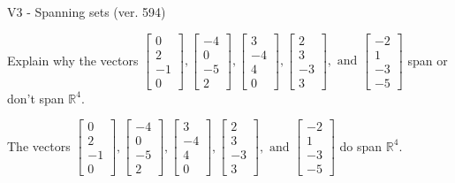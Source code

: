 \begin{exercise}
  \begin{exerciseTitle}V3 - Spanning sets (ver. 594)\end{exerciseTitle}
  \begin{exerciseStatement}
    Explain why the vectors \(\left[\begin{array}{r}
0 \\
2 \\
-1 \\
0
\end{array}\right] , \left[\begin{array}{r}
-4 \\
0 \\
-5 \\
2
\end{array}\right] , \left[\begin{array}{r}
3 \\
-4 \\
4 \\
0
\end{array}\right] , \left[\begin{array}{r}
2 \\
3 \\
-3 \\
3
\end{array}\right] , \text{ and } \left[\begin{array}{r}
-2 \\
1 \\
-3 \\
-5
\end{array}\right]\) span or don't span \(\mathbb{R}^4\). 
	


  \end{exerciseStatement}
  \begin{exerciseAnswer}
   The vectors \(\left[\begin{array}{r}
0 \\
2 \\
-1 \\
0
\end{array}\right] , \left[\begin{array}{r}
-4 \\
0 \\
-5 \\
2
\end{array}\right] , \left[\begin{array}{r}
3 \\
-4 \\
4 \\
0
\end{array}\right] , \left[\begin{array}{r}
2 \\
3 \\
-3 \\
3
\end{array}\right] , \text{ and } \left[\begin{array}{r}
-2 \\
1 \\
-3 \\
-5
\end{array}\right]\) 
  	 do  
	span \(\mathbb{R}^4\).
  



\end{exerciseAnswer}
\end{exercise}

